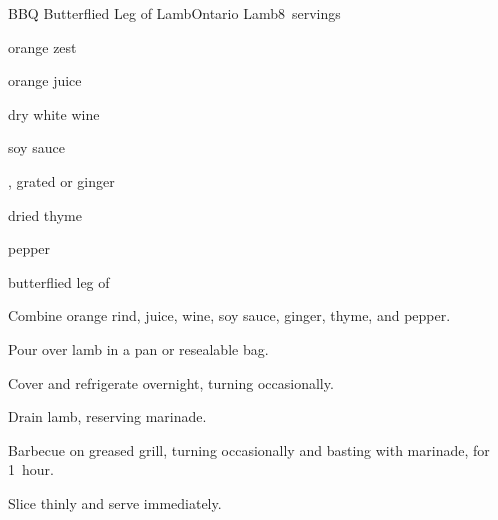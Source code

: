 \begin{recipe}{BBQ Butterflied Leg of Lamb}{Ontario Lamb}{8~servings}

\begin{ingredients}
\item {} orange zest
\item \C{\half} orange juice
\item \C{\half} dry white wine
\item \C{\quarter} soy sauce
\item {} , grated or  ginger
\item {} dried thyme
\item \tp{\quarter} pepper
\item {} butterflied leg of 
\end{ingredients}

\begin{directions}
\item Combine orange rind, juice, wine, soy sauce, ginger, thyme, and pepper.
\item Pour over lamb in a pan or resealable bag.
\item Cover and refrigerate overnight, turning occasionally.
\item Drain lamb, reserving marinade.
\item Barbecue on greased grill, turning occasionally and basting with marinade, for 1~hour.
\item Slice thinly and serve immediately.
\end{directions}

\end{recipe}
